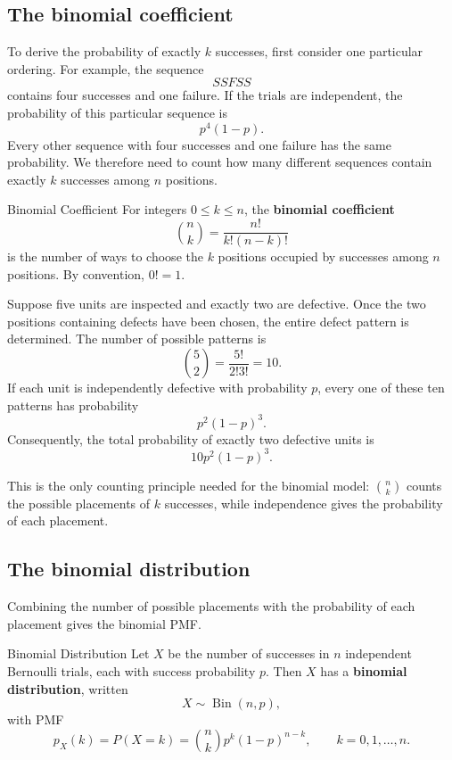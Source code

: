 \subsection{The binomial coefficient}

To derive the probability of exactly $k$ successes, first consider one particular ordering. For example, the sequence
\[
SSFSS
\]
contains four successes and one failure. If the trials are independent, the probability of this particular sequence is
\[
p^4(1-p).
\]
Every other sequence with four successes and one failure has the same probability. We therefore need to count how many different sequences contain exactly $k$ successes among $n$ positions.

\clearpage

\begin{definition}{Binomial Coefficient}
    For integers $0\leq k\leq n$, the \textbf{binomial coefficient}
    \[
    \binom{n}{k}
    =\frac{n!}{k!(n-k)!}
    \]
    is the number of ways to choose the $k$ positions occupied by successes among $n$ positions. By convention, $0!=1$.
\end{definition}

\begin{example}\par
Suppose five units are inspected and exactly two are defective. Once the two positions containing defects have been chosen, the entire defect pattern is determined. The number of possible patterns is
\[
\binom{5}{2}
=\frac{5!}{2!3!}
=10.
\]
If each unit is independently defective with probability $p$, every one of these ten patterns has probability
\[
p^2(1-p)^3.
\]
Consequently, the total probability of exactly two defective units is
\[
10p^2(1-p)^3.
\]
\end{example}

This is the only counting principle needed for the binomial model: $\binom{n}{k}$ counts the possible placements of $k$ successes, while independence gives the probability of each placement.

\subsection{The binomial distribution}

Combining the number of possible placements with the probability of each placement gives the binomial PMF.

\begin{definition}{Binomial Distribution}
    Let $X$ be the number of successes in $n$ independent Bernoulli trials, each with success probability $p$. Then $X$ has a \textbf{binomial distribution}, written
    \[
    X\sim\operatorname{Bin}(n,p),
    \]
    with PMF
    \[
    p_X(k)
    =P(X=k)
    =\binom{n}{k}p^k(1-p)^{n-k},
    \qquad k=0,1,\ldots,n.
    \]
\end{definition}

